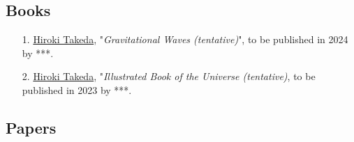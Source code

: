 \documentclass[uplatex, 12pt]{article}
\begin{document}
\subsection*{Books}
\begin{enumerate}
\item[{1}.] \uline{Hiroki Takeda}, "\emph{Gravitational Waves (tentative)}", to be published in 2024 by ***.

\item[{2}.] \uline{Hiroki Takeda}, "\emph{Illustrated Book of the Universe (tentative)}, to be published in 2023 by ***.
\end{enumerate}
\noindent

\subsection*{Papers}
\end{document}
